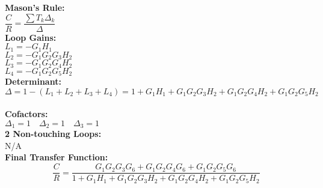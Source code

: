 \documentclass[11pt,letterpaper]{article}
\begin{document}
\begin{center}
\noindent\textbf{Mason's Rule:} \\
\hspace*{1em} \( \dfrac{C}{R} = \dfrac{\sum T_k \Delta_k}{\Delta} \) \\[6pt]

\noindent\textbf{Loop Gains:} \\
\hspace*{1em} \( L_1 = -G_1H_1 \) \\
\hspace*{1em} \( L_2 = -G_1G_2G_3H_2 \) \\
\hspace*{1em} \( L_3 = -G_1G_2G_4H_2 \) \\
\hspace*{1em} \( L_4 = -G_1G_2G_5H_2 \) \\[6pt]

\noindent\textbf{Determinant:} \\
\hspace*{1em} 
\[
\Delta = 1 - (L_1 + L_2 + L_3 + L_4) = 1 + G_1H_1 + G_1G_2G_3H_2 + G_1G_2G_4H_2 + G_1G_2G_5H_2
\] \\

\noindent\textbf{Cofactors:} \\
\hspace*{1em} \( \Delta_1 = 1 \quad \Delta_2 = 1 \quad \Delta_3 = 1 \) \\[6pt]

\noindent\textbf{2 Non-touching Loops:} \\
\hspace*{1em} N/A \\[6pt]

\noindent\textbf{Final Transfer Function:}
\[
\boxed{
\dfrac{C}{R} = \dfrac{G_1G_2G_3G_6 + G_1G_2G_4G_6 + G_1G_2G_5G_6}
{1 + G_1H_1 + G_1G_2G_3H_2 + G_1G_2G_4H_2 + G_1G_2G_5H_2}
}
\]

\end{center}

\clearpage
\end{document}
